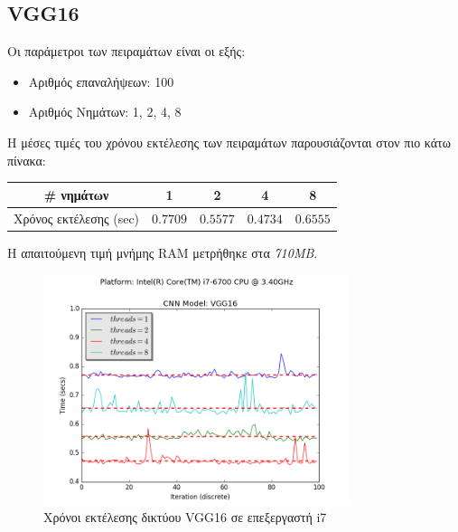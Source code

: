 
\subsection{VGG16}

Οι παράμετροι των πειραμάτων είναι οι εξής:
\begin{itemize}
  \item{Αριθμός επαναλήψεων: 100}
  \item{Αριθμός Νημάτων: 1, 2, 4, 8}
\end{itemize}

Η μέσες τιμές του χρόνου εκτέλεσης των πειραμάτων παρουσιάζονται στον πιο κάτω πίνακα:

\begin{center}
  \small
  \begin{tabular}{ | c | c | c | c | c | }
    \hline
    \rowcolor{Gray}
    \# νημάτων & 1 & 2 & 4 & 8 \\
    \hline
    Χρόνος εκτέλεσης (sec) & $0.7709$ & $0.5577$ & $0.4734$ & $0.6555$ \\
    \hline
  \end{tabular}
\end{center}

Η απαιτούμενη τιμή μνήμης RAM μετρήθηκε στα \emph{710MB}.

\begin{figure}[!ht]
  \centering
  \includegraphics[width=0.8\textwidth]{./images/chapter6/benchmark_vgg16_i7.png}
  \caption[Χρόνoι εκτέλεσης δικτύου VGG16 σε επεξεργαστή i7]{Χρόνοι εκτέλεσης δικτύου VGG16 σε επεξεργαστή i7}
  \label{fig:vgg16_results_i7}
\end{figure}



